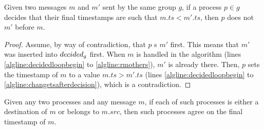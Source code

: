 \documentclass[times, 10pt]{article}
\begin{document}
\begin{lems} \label{lemma:lowertsfrmcastfirst}
Given two messages $m$ and $m'$ sent by the same group $g$, if a process $p \in g$ decides that their final timestamps are such that $m.ts < m'.ts$, then $p$ does not \rmcast{} $m'$ before $m$.
\end{lems}

\begin{proof}
Assume, by way of contradiction, that $p$ \rmcast{}s $m'$ first. This means that $m'$ was inserted into $decided\text{$_g$}$ first. When $m$ is handled in the algorithm (lines \ref{algline:decidedloopbegin} to \ref{algline:rmothers}), $m'$ is already there. Then, $p$ sets the timestamp of $m$ to a value $m.ts > m'.ts$ (lines \ref{algline:decidedloopbegin} to \ref{algline:changetsafterdecision}), which is a contradiction.
\end{proof}





\begin{lems} \label{lemma:agreetimestamps}
Given any two processes and any message $m$, if each of such processes is either a destination of $m$ or belongs to $m.src$, then such processes agree on the final timestamp of $m$.
\end{lems}
\end{document}
